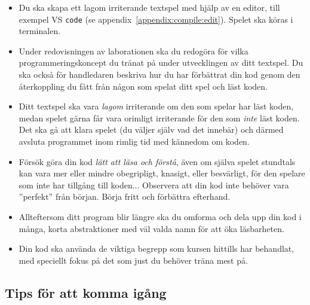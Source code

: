 \begin{itemize}
\item Du ska skapa ett lagom irriterande textspel med hjälp av en editor, till exempel VS \texttt{code} (se appendix~\ref{appendix:compile:edit}). Spelet ska köras i terminalen.

\item Under redovisningen av laborationen ska du redogöra för vilka programmeringskoncept du tränat på under utvecklingen av ditt textspel. Du ska också för handledaren beskriva hur du har förbättrat din kod genom den återkoppling du fått från någon som spelat ditt spel och läst koden.

\item Ditt textspel ska vara \emph{lagom} irriterande om den som spelar har läst koden, medan spelet gärna får vara orimligt irriterande för den som \emph{inte} läst koden. Det ska gå att klara spelet (du väljer själv vad det innebär) och därmed avsluta programmet inom rimlig tid med kännedom om koden.

\item Försök göra din kod \textit{lätt att läsa och förstå}, även om själva spelet stundtals kan vara mer eller mindre obegripligt, knasigt, eller besvärligt, för den spelare som inte har tillgång till koden... Observera att din kod inte behöver vara ''perfekt'' från början. Börja fritt och förbättra efterhand.

\item Allteftersom ditt program blir längre ska du omforma och dela upp din kod i många, korta abstraktioner med väl valda namn för att öka läsbarheten.

\item Din kod ska använda de viktiga begrepp som kursen hittills har behandlat, med speciellt fokus på det som just du behöver träna mest på.

\end{itemize}

\subsection{Tips för att komma igång}

